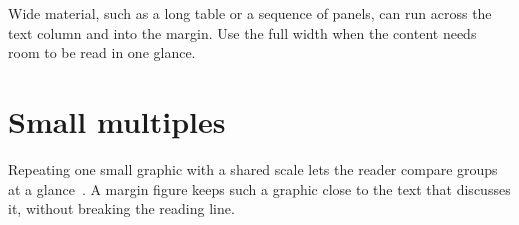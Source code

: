 \documentclass{tufte-handout}
\begin{document}
\begin{fullwidth}
  Wide material, such as a long table or a sequence of panels, can run across
  the text column and into the margin. Use the full width when the content
  needs room to be read in one glance.
\end{fullwidth}

\section{Small multiples}

Repeating one small graphic with a shared scale lets the reader compare
groups at a glance~\cite{tufte2006}. A margin figure keeps such a graphic close to the text
that discusses it, without breaking the reading line.

\begin{marginfigure}
  \caption{A margin figure keeps its caption beside the text it supports.}
\end{marginfigure}



\end{document}
